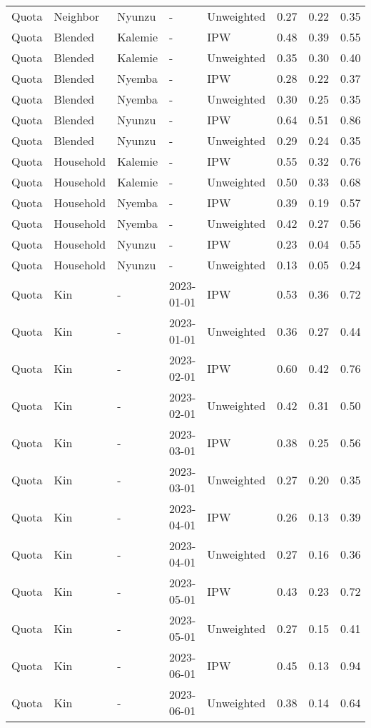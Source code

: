 \begin{longtable}[t]{lllllrrr}
Quota & Neighbor & Nyunzu & - & Unweighted & 0.27 & 0.22 & 0.35\\
Quota & Blended & Kalemie & - & IPW & 0.48 & 0.39 & 0.55\\
\addlinespace
Quota & Blended & Kalemie & - & Unweighted & 0.35 & 0.30 & 0.40\\
Quota & Blended & Nyemba & - & IPW & 0.28 & 0.22 & 0.37\\
Quota & Blended & Nyemba & - & Unweighted & 0.30 & 0.25 & 0.35\\
Quota & Blended & Nyunzu & - & IPW & 0.64 & 0.51 & 0.86\\
Quota & Blended & Nyunzu & - & Unweighted & 0.29 & 0.24 & 0.35\\
\addlinespace
Quota & Household & Kalemie & - & IPW & 0.55 & 0.32 & 0.76\\
Quota & Household & Kalemie & - & Unweighted & 0.50 & 0.33 & 0.68\\
Quota & Household & Nyemba & - & IPW & 0.39 & 0.19 & 0.57\\
Quota & Household & Nyemba & - & Unweighted & 0.42 & 0.27 & 0.56\\
Quota & Household & Nyunzu & - & IPW & 0.23 & 0.04 & 0.55\\
\addlinespace
Quota & Household & Nyunzu & - & Unweighted & 0.13 & 0.05 & 0.24\\
Quota & Kin & - & 2023-01-01 & IPW & 0.53 & 0.36 & 0.72\\
Quota & Kin & - & 2023-01-01 & Unweighted & 0.36 & 0.27 & 0.44\\
Quota & Kin & - & 2023-02-01 & IPW & 0.60 & 0.42 & 0.76\\
Quota & Kin & - & 2023-02-01 & Unweighted & 0.42 & 0.31 & 0.50\\
\addlinespace
Quota & Kin & - & 2023-03-01 & IPW & 0.38 & 0.25 & 0.56\\
Quota & Kin & - & 2023-03-01 & Unweighted & 0.27 & 0.20 & 0.35\\
Quota & Kin & - & 2023-04-01 & IPW & 0.26 & 0.13 & 0.39\\
Quota & Kin & - & 2023-04-01 & Unweighted & 0.27 & 0.16 & 0.36\\
Quota & Kin & - & 2023-05-01 & IPW & 0.43 & 0.23 & 0.72\\
\addlinespace
Quota & Kin & - & 2023-05-01 & Unweighted & 0.27 & 0.15 & 0.41\\
Quota & Kin & - & 2023-06-01 & IPW & 0.45 & 0.13 & 0.94\\
Quota & Kin & - & 2023-06-01 & Unweighted & 0.38 & 0.14 & 0.64\\

\end{longtable}
